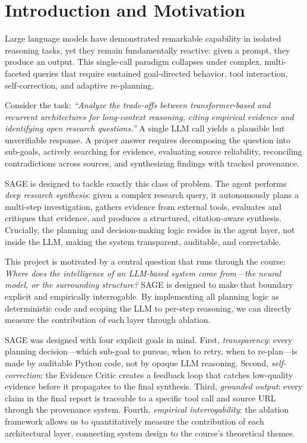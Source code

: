 \documentclass[11pt]{article}
\begin{document}
\section{Introduction and Motivation}

Large language models have demonstrated remarkable capability in isolated reasoning tasks, yet they remain fundamentally reactive: given a prompt, they produce an output. This single-call paradigm collapses under complex, multi-faceted queries that require sustained goal-directed behavior, tool interaction, self-correction, and adaptive re-planning.

Consider the task: \textit{``Analyze the trade-offs between transformer-based and recurrent architectures for long-context reasoning, citing empirical evidence and identifying open research questions.''} A single LLM call yields a plausible but unverifiable response. A proper answer requires decomposing the question into sub-goals, actively searching for evidence, evaluating source reliability, reconciling contradictions across sources, and synthesizing findings with tracked provenance.

SAGE is designed to tackle exactly this class of problem. The agent performs \emph{deep research synthesis}: given a complex research query, it autonomously plans a multi-step investigation, gathers evidence from external tools, evaluates and critiques that evidence, and produces a structured, citation-aware synthesis. Crucially, the planning and decision-making logic resides in the agent layer, not inside the LLM, making the system transparent, auditable, and correctable.

This project is motivated by a central question that runs through the course: \textit{Where does the intelligence of an LLM-based system come from---the neural model, or the surrounding structure?} SAGE is designed to make that boundary explicit and empirically interrogable. By implementing all planning logic as deterministic code and scoping the LLM to per-step reasoning, we can directly measure the contribution of each layer through ablation.

SAGE was designed with four explicit goals in mind. First, \emph{transparency}: every planning decision---which sub-goal to pursue, when to retry, when to re-plan---is made by auditable Python code, not by opaque LLM reasoning. Second, \emph{self-correction}: the Evidence Critic creates a feedback loop that catches low-quality evidence before it propagates to the final synthesis. Third, \emph{grounded output}: every claim in the final report is traceable to a specific tool call and source URL through the provenance system. Fourth, \emph{empirical interrogability}: the ablation framework allows us to quantitatively measure the contribution of each architectural layer, connecting system design to the course's theoretical themes.
\end{document}
